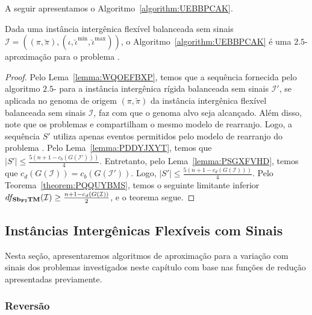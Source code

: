 A seguir apresentamos o Algoritmo~\ref{algorithm:UEBBPCAK}.



\begin{theorem}\label{theorem:DWYTBIPX}
Dada uma instância intergênica flexível balanceada sem sinais $\mathcal{I} = ((\pi,\breve\pi),(\iota,\breve\iota^{\min},\breve\iota^{\max}))$, o Algoritmo~\ref{algorithm:UEBBPCAK} é uma $2.5$-aproximação para o problema \SbFIT{}.
\end{theorem}
\begin{proof}
Pelo Lema~\ref{lemma:WQOEFBXP}, temos que a sequência fornecida pelo algoritmo $2.5$-\SbIT{} para a instância intergênica rígida balanceada sem sinais $\mathcal{I'}$, se aplicada no genoma de origem $(\pi,\breve\pi)$ da instância intergênica flexível balanceada sem sinais $\mathcal{I}$, faz com que o genoma alvo seja alcançado. Além disso, note que os problemas \SbITM{} e \SbFITM{} compartilham o mesmo modelo de rearranjo. Logo, a sequência $S'$ utiliza apenas eventos permitidos pelo modelo de rearranjo do problema \SbFITM{}. Pelo Lema~\ref{lemma:PDDYJXYT}, temos que $|S'| \le \frac{5({n+1} - c_b(G(\mathcal{I}')))}{4}$. Entretanto, pelo Lema~\ref{lemma:PSGXFVHD}, temos que $c_d(G(\mathcal{I})) = c_b(G(\mathcal{I}'))$. Logo, $|S'| \le \frac{5({n+1} - c_d(G(\mathcal{I})))}{4}$. Pelo Teorema~\ref{theorem:PQQUYBMS}, temos o seguinte limitante inferior $df_{\textbf{Sb\textsubscript{FI}TM}}(\mathcal{I}) \ge \frac{{n+1} - c_d(G(\mathcal{I}))}{2}$, e o teorema segue.
\end{proof}

\subsection{Instâncias Intergênicas Flexíveis com Sinais}

Nesta seção, apresentaremos algoritmos de aproximação para a variação com sinais dos problemas investigados neste capítulo com base nas funções de redução apresentadas previamente.

\subsubsection{Reversão}

